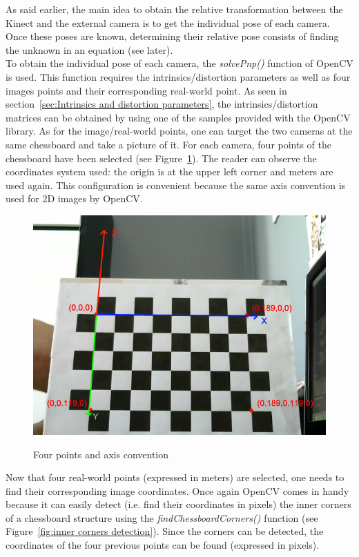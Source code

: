 As said earlier, the main idea to obtain the relative transformation between the Kinect and the external camera is to get the individual pose of each camera. Once these poses are known, determining their relative pose consists of finding the unknown in an equation (see later).\\

To obtain the individual pose of each camera, the \textit{solvePnp()} function of OpenCV is used. This function requires the intrinsics/distortion parameters as well as four images points and their corresponding real-world point. As seen in section~\ref{sec:Intrinsics and distortion parameters}, the intrinsics/distortion matrices can be obtained by using one of the samples provided with the OpenCV library. As for the image/real-world points, one can target the two cameras at the same chessboard and take a picture of it. For each camera, four points of the chessboard have been selected (see Figure~\ref{fig:four points}). The reader can observe the coordinates system used: the origin is at the upper left corner and meters are used again. This configuration is convenient because the same axis convention is used for 2D images by OpenCV.\\

\begin{figure}
\caption{Four points and axis convention}
\centering
    \includegraphics[width=1.0\textwidth]{images/fourPoints.jpg}
\label{fig:four points}
\end{figure}

Now that four real-world points (expressed in meters) are selected, one needs to find their corresponding image coordinates. Once again OpenCV comes in handy because it can easily detect (i.e. find their coordinates in pixels) the inner corners of a chessboard structure using the \textit{findChessboardCorners()} function (see Figure~\ref{fig:inner corners detection}). Since the corners can be detected, the coordinates of the four previous points can be found (expressed in pixels).

